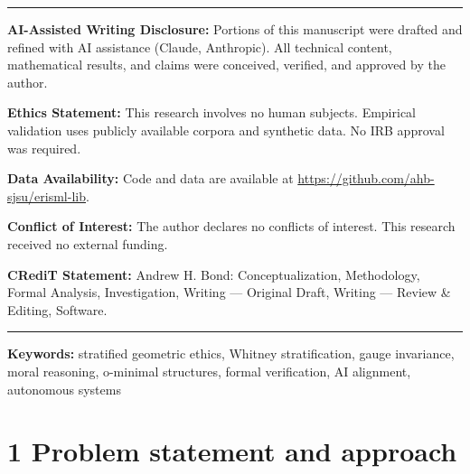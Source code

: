 \documentclass[12pt]{article}
\theoremstyle{plain}
\theoremstyle{definition}
\theoremstyle{remark}
\begin{document}
\begin{titlepage}
\begin{abstract}
We introduce the Bond Invariance Principle (BIP), which requires ethical
judgments to depend only on morally relevant relationships, not
arbitrary representation choices, and prove that our axiom system
implies BIP.

SGE serves as the theoretical foundation for the DEME architecture,
providing mathematical justification for design choices including
multi-dimensional moral vector spaces, governance profiles with veto
regions and lexical priorities, and layered enforcement architectures.
Since initial development, a comprehensive reference implementation
(196 commits, 15 development sprints) has realized all core theoretical
constructs as rank-6 tensors with hardware-accelerated backends,
and the Bond Invariance Principle has been empirically validated across
11 languages (80.0\% F1, 11.1$\times$ structural-to-surface ratio,
\(p = 0.023\)).
\end{abstract}

\vfill

\noindent\rule{\linewidth}{0.4pt}
\small
\noindent\textbf{AI-Assisted Writing Disclosure:} Portions of this manuscript were drafted and refined with AI assistance (Claude, Anthropic). All technical content, mathematical results, and claims were conceived, verified, and approved by the author.

\noindent\textbf{Ethics Statement:} This research involves no human subjects. Empirical validation uses publicly available corpora and synthetic data. No IRB approval was required.

\noindent\textbf{Data Availability:} Code and data are available at \url{https://github.com/ahb-sjsu/erisml-lib}.

\noindent\textbf{Conflict of Interest:} The author declares no conflicts of interest. This research received no external funding.

\noindent\textbf{CRediT Statement:} Andrew H. Bond: Conceptualization, Methodology, Formal Analysis, Investigation, Writing --- Original Draft, Writing --- Review \& Editing, Software.
\noindent\rule{\linewidth}{0.4pt}
\normalsize

\end{titlepage}

\noindent\textbf{Keywords:} stratified geometric ethics, Whitney stratification, gauge invariance, moral reasoning, o-minimal structures, formal verification, AI alignment, autonomous systems

\section{1 Problem statement and
approach}\label{problem-statement-and-approach}
\end{document}
